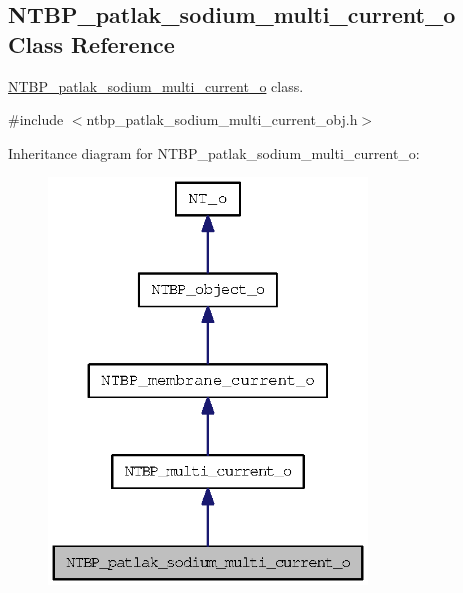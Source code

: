 \subsection{NTBP\_\-patlak\_\-sodium\_\-multi\_\-current\_\-o Class Reference}
\label{class_n_t_b_p__patlak__sodium__multi__current__o}


\hyperlink{class_n_t_b_p__patlak__sodium__multi__current__o}{NTBP\_\-patlak\_\-sodium\_\-multi\_\-current\_\-o} class.  




{\ttfamily \#include $<$ntbp\_\-patlak\_\-sodium\_\-multi\_\-current\_\-obj.h$>$}



Inheritance diagram for NTBP\_\-patlak\_\-sodium\_\-multi\_\-current\_\-o:
\nopagebreak
\begin{figure}[H]
\begin{center}
\leavevmode
\includegraphics[width=240pt]{class_n_t_b_p__patlak__sodium__multi__current__o__inherit__graph}
\end{center}
\end{figure}


